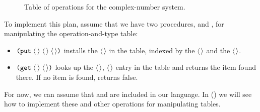 \begin{figure}[tb]
\label{Figure 2.22}
\centering
\begin{comment}
\begin{quote}
\heading{Figure 2.22:} Table of operations for the complex-number system.

\begin{example}
           |               Types
Operations | Polar           | Rectangular
===========+=================+======================
real-part  | real-part-polar | real-part-rectangular
imag-part  | imag-part-polar | imag-part-rectangular
magnitude  | magnitude-polar | magnitude-rectangular
angle      | angle-polar     | angle-rectangular
\end{example}
\end{quote}
\end{comment}

\par\bigskip
\noindent
{} Table of operations for the complex-number system. 
\end{figure}

To implement this plan, assume that we have two procedures,  and
, for manipulating the operation-and-type table:

\begin{itemize}

\item
\( \hbox{\tt(put}\;\langle \)\( \kern0.1em\rangle\;\langle \)\( \kern0.08em\rangle\;\langle \)\( \kern0.08em\rangle\hbox{\tt)} \) installs the \( \langle \)\( \kern0.08em\rangle \) in the table, indexed by the
\( \langle \)\( \kern0.1em\rangle \) and the \( \langle \)\( \kern0.08em\rangle \).

\item
\( \hbox{\tt(get}\;\langle \)\( \kern0.1em\rangle\;\langle \)\( \kern0.08em\rangle\hbox{\tt)} \) looks up the
\( \langle \)\( \kern0.08em\rangle \), \( \langle \)\( \kern0.08em\rangle \) entry in the table and
returns the item found there.  If no item is found,  returns false.

\end{itemize}

\noindent
For now, we can assume that  and  are included in our
language.  In  () we
will see how to implement these and other operations for manipulating tables.

